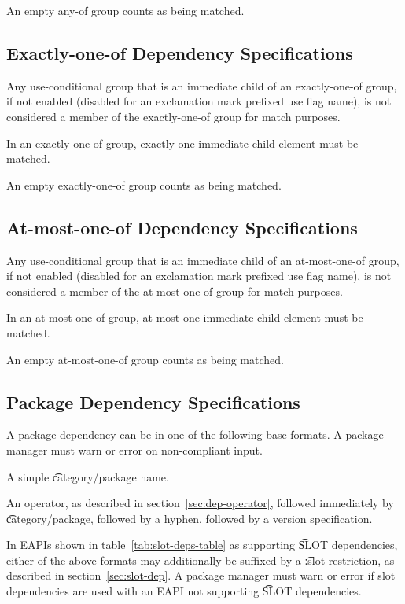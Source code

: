 An empty any-of group counts as being matched.

\subsection{Exactly-one-of Dependency Specifications}

Any use-conditional group that is an immediate child of an exactly-one-of group, if not enabled
(disabled for an exclamation mark prefixed use flag name), is not considered a member of the
exactly-one-of group for match purposes.

In an exactly-one-of group, exactly one immediate child element must be matched.

An empty exactly-one-of group counts as being matched.

\subsection{At-most-one-of Dependency Specifications}

Any use-conditional group that is an immediate child of an at-most-one-of group, if not enabled
(disabled for an exclamation mark prefixed use flag name), is not considered a member of the
at-most-one-of group for match purposes.

In an at-most-one-of group, at most one immediate child element must be matched.

An empty at-most-one-of group counts as being matched.

\subsection{Package Dependency Specifications}

A package dependency can be in one of the following base formats. A package manager must warn or
error on non-compliant input.

\begin{compactitem}
\item A simple \t{category/package} name.
\item An operator, as described in section~\ref{sec:dep-operator}, followed immediately by
    \t{category/package}, followed by a hyphen, followed by a version specification.
\end{compactitem}

In EAPIs shown in table~\ref{tab:slot-deps-table} as supporting \t{SLOT} dependencies, either of the
above formats may additionally be suffixed by a \t{:slot} restriction, as described in
section~\ref{sec:slot-dep}. A package manager must warn or error if slot dependencies are used with an
EAPI not supporting \t{SLOT} dependencies.

